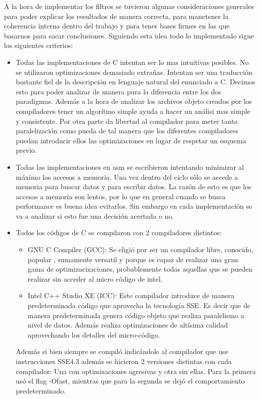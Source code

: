 	A la hora de implementar los filtros se tuvieron algunas consideraciones generales 
para poder explicar los resultados de manera correcta, para manetener la coherencia
interna dentro del trabajo y para tener bases firmes en las que basarnos para sacar
conclusiones.
	Siguiendo esta idea todo lo implementado sigue los siguientes criterios:
		\begin{itemize}
			\item Todas las implementaciones de C intentan ser lo mas intuitivas posibles. No se
			utilizaron optimizaciones demasiado extrañas. Intentan ser una traducción bastante
			fiel de la descripción en lenguaje natural del enunciado a C. Decimos esto para
			poder analizar de manera pura la diferencia entre los dos paradigmas. Además
			a la hora de analizar los archivos objeto creados por los compiladores
			tener un algorítmo simple ayuda a hacer un análisi mas simple y consistente.
			Por otra parte da libertad al compilador para meter tanta paralelización como pueda
			de tal manera que los diferentes compiladores puedan introducir ellos las optimizaciones
			en lugar de respetar un esquema previo.

			\item Todas las implementaciones en asm se escribieron intentando minimizar al máximo
			los accesos a memoria. Una vez dentro del ciclo sólo se accede a memoria para buscar
			datos y para escribir datos. La razón de esto es que los accesos a memoria son lentos,
			por lo que en general cuando se busca performance es buena idea evitarlos. Sin embargo
			en cada implementación se va a analizar si esto fue una decisión acertada o no.
			
			\item Todos los códigos de C se compilaron con 2 compiladores distintos:
				\begin{itemize}
					\item GNU C Compiler (GCC): Se eligió por ser un compilador libre, conocido, popular
					, sumamente versatil y porque es capaz de realizar una gran gama de optimizacizaciones, probablemente
					todas aquellas que se pueden realizar sin acceder al micro código de intel.

					\item Intel C++ Studio XE (ICC): Este compilador introduce de manera predeterminada código
					que aprovecha la tecnología SSE. Es decir que de manera predeterminada genera código objeto
					que realiza paralelismo a nivel de datos. Además realiza optimizaciones de altísima calidad
					aprovechando los detalles del micro-código.

				\end{itemize} 
				
			Además si bien siempre se compiló indicándole al compilador que use instrucciones SSE4.3 además
			se hicieron 2 versiones distintas con cada compilador: Una con optimizaciones agresivas y otra sin
			ellas. Para la primera usó el flag -Ofast, mientras que para la segunda se dejó el comportamiento
			predeterminado.

		\end{itemize}

